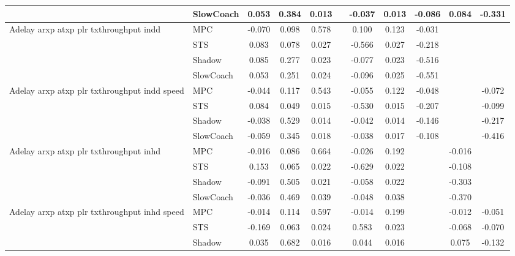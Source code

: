 \begin{tabular}{|l|l|*{9}{c|}}
                              & SlowCoach &    0.053 &     0.384 &     0.013 &     & -0.037 &  0.013 &  -0.086 &   0.084 &   -0.331 \\
\midrule
Adelay arxp atxp plr txthroughput indd    & MPC &   -0.070 &     0.098 &     0.578 &     &  0.100 &  0.123 &  -0.031 &      &       \\
                              & STS &    0.083 &     0.078 &     0.027 &     & -0.566 &  0.027 &  -0.218 &      &       \\
                              & Shadow &    0.085 &     0.277 &     0.023 &     & -0.077 &  0.023 &  -0.516 &      &       \\
                              & SlowCoach &    0.053 &     0.251 &     0.024 &     & -0.096 &  0.025 &  -0.551 &      &       \\
\midrule
Adelay arxp atxp plr txthroughput indd speed    & MPC &   -0.044 &     0.117 &     0.543 &     & -0.055 &  0.122 &  -0.048 &      &   -0.072 \\
                              & STS &    0.084 &     0.049 &     0.015 &     & -0.530 &  0.015 &  -0.207 &      &   -0.099 \\
                              & Shadow &   -0.038 &     0.529 &     0.014 &     & -0.042 &  0.014 &  -0.146 &      &   -0.217 \\
                              & SlowCoach &   -0.059 &     0.345 &     0.018 &     & -0.038 &  0.017 &  -0.108 &      &   -0.416 \\
\midrule
Adelay arxp atxp plr txthroughput inhd    & MPC &   -0.016 &     0.086 &     0.664 &     & -0.026 &  0.192 &      &  -0.016 &       \\
                              & STS &    0.153 &     0.065 &     0.022 &     & -0.629 &  0.022 &      &  -0.108 &       \\
                              & Shadow &   -0.091 &     0.505 &     0.021 &     & -0.058 &  0.022 &      &  -0.303 &       \\
                              & SlowCoach &   -0.036 &     0.469 &     0.039 &     & -0.048 &  0.038 &      &  -0.370 &       \\
\midrule
Adelay arxp atxp plr txthroughput inhd speed    & MPC &   -0.014 &     0.114 &     0.597 &     & -0.014 &  0.199 &      &  -0.012 &   -0.051 \\
                              & STS &   -0.169 &     0.063 &     0.024 &     &  0.583 &  0.023 &      &  -0.068 &   -0.070 \\
                              & Shadow &    0.035 &     0.682 &     0.016 &     &  0.044 &  0.016 &      &   0.075 &   -0.132 \\

\end{tabular}
